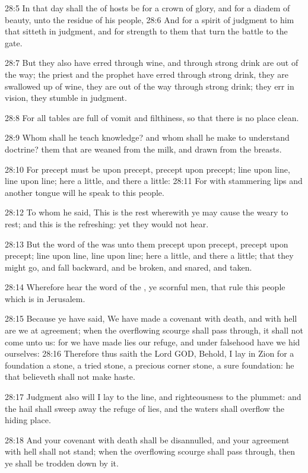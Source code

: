 28:5 In that day shall the \LORD of hosts be for a crown of glory, and for a diadem of beauty, unto the residue of his people, 28:6 And for a spirit of judgment to him that sitteth in judgment, and for strength to them that turn the battle to the gate.

28:7 But they also have erred through wine, and through strong drink are out of the way; the priest and the prophet have erred through strong drink, they are swallowed up of wine, they are out of the way through strong drink; they err in vision, they stumble in judgment.

28:8 For all tables are full of vomit and filthiness, so that there is no place clean.

28:9 Whom shall he teach knowledge? and whom shall he make to understand doctrine? them that are weaned from the milk, and drawn from the breasts.

28:10 For precept must be upon precept, precept upon precept; line upon line, line upon line; here a little, and there a little: 28:11 For with stammering lips and another tongue will he speak to this people.

28:12 To whom he said, This is the rest wherewith ye may cause the weary to rest; and this is the refreshing: yet they would not hear.

28:13 But the word of the \LORD was unto them precept upon precept, precept upon precept; line upon line, line upon line; here a little, and there a little; that they might go, and fall backward, and be broken, and snared, and taken.

28:14 Wherefore hear the word of the \LORD, ye scornful men, that rule this people which is in Jerusalem.

28:15 Because ye have said, We have made a covenant with death, and with hell are we at agreement; when the overflowing scourge shall pass through, it shall not come unto us: for we have made lies our refuge, and under falsehood have we hid ourselves: 28:16 Therefore thus saith the Lord GOD, Behold, I lay in Zion for a foundation a stone, a tried stone, a precious corner stone, a sure foundation: he that believeth shall not make haste.

28:17 Judgment also will I lay to the line, and righteousness to the plummet: and the hail shall sweep away the refuge of lies, and the waters shall overflow the hiding place.

28:18 And your covenant with death shall be disannulled, and your agreement with hell shall not stand; when the overflowing scourge shall pass through, then ye shall be trodden down by it.

